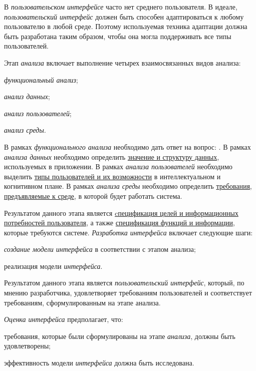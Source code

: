 В \textit{пользовательском интерфейсе} часто нет среднего пользователя.
В идеале, \textit{пользовательский интерфейс} должен быть способен адаптироваться к любому пользователю в любой среде. Поэтому используемая техника адаптации должна быть разработана таким образом, чтобы она могла поддерживать все типы пользователей.

Этап \textit{анализа} включает выполнение четырех взаимосвязанных видов анализа:
\begin{textitemize}
    \item \textit{функциональный анализ};
    \item \textit{анализ данных};
    \item \textit{анализ пользователей};
    \item \textit{анализ среды}.
\end{textitemize}

В рамках \textit{функционального анализа} необходимо дать ответ на вопрос: .
В рамках \textit{анализа данных} необходимо определить \uline{значение и структуру данных}, используемых в приложении.
В рамках \textit{анализа пользователей} необходимо выделить \uline{типы пользователей и их возможности} в интеллектуальном и когнитивном плане.
В рамках \textit{анализа среды} необходимо определить \uline{требования, предъявляемые к среде}, в которой будет работать система.

Результатом данного этапа является \uline{cпецификация целей и информационных потребностей пользователя}, а также \uline{спецификация функций и информации}, которые требуются системе.
\textit{Разработка интерфейса} включает следующие шаги:
\begin{textitemize}
	\item \textit{создание модели интерфейса} в соответствии с этапом анализа;
	\item реализация модели \textit{интерфейса}.
\end{textitemize}

Результатом данного этапа является \textit{пользовательский интерфейс}, который, по мнению разработчика, удовлетворяет требованиям пользователей и соответствует требованиям, сформулированным на этапе анализа.

\textit{Оценка интерфейса} предполагает, что:
\begin{textitemize}
	\item требования, которые были сформулированы на этапе \textit{анализа}, должны быть удовлетворены;
	\item эффективность модели \textit{интерфейса} должна быть исследована.
\end{textitemize}

